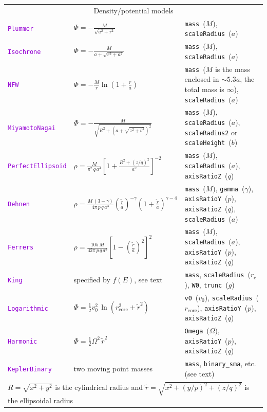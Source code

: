 \documentclass[12pt]{article}
\newcommand{\ttt}[1]{\textcolor{darkviolet}{\texttt{#1}}}
\newcommand{\ppp}[1]{\textcolor{darkolive} {\texttt{#1}}}
\begin{document}
\begin{table}
\begin{tabular}{l m{5cm} >{\raggedright\arraybackslash}m{7cm}}
\multicolumn{3}{c}{Density/potential models} \\

\ttt{Plummer} & $\Phi = -\frac{M}{\sqrt{a^2+r^2}}$ & \ppp{mass}~($M$), \ppp{scaleRadius}~($a$) \\[2mm]

\ttt{Isochrone} & $\Phi = - \frac{M}{a + \sqrt{r^2 + a^2}}$ & \ppp{mass}~($M$), \ppp{scaleRadius}~($a$) \\[2mm]

\ttt{NFW} & $\Phi = -\frac{M}{r} \ln\left(1 + \frac{r}{a}\right)$ & \ppp{mass}~($M$ {\footnotesize is the mass enclosed in $\sim5.3a$, the total mass is $\infty$}), \ppp{scaleRadius}~($a$) \\[2mm]

\ttt{MiyamotoNagai} & $\Phi = -\frac{M}{\sqrt{R^2 + \left(a + \sqrt{z^2+b^2}\right)^2}}$ & \ppp{mass}~($M$), \ppp{scaleRadius}~($a$), \ppp{scaleRadius2} or \ppp{scaleHeight}~($b$) \\[2mm]

\ttt{PerfectEllipsoid}\!\! & $\rho = \frac{M}{\pi^2\,q\,a^3} \left[ 1 + \frac{R^2+(z/q)^2}{a^2} \right]^{-2}$ &  \ppp{mass}~($M$), \ppp{scaleRadius}~($a$), \ppp{axisRatioZ}~($q$) \\[2mm]

\ttt{Dehnen} & $\rho = \frac{M\,(3-\gamma)}{4\pi\,p\,q\,a^3} \left(\frac{\tilde r}a\right)^{-\gamma} \left(1+\frac{\tilde r}a\right)^{\gamma-4}$\!\! &  \ppp{mass}~($M$), \ppp{gamma}~($\gamma$), \ppp{axisRatioY}~($p$), \ppp{axisRatioZ}~($q$), \ppp{scaleRadius}~($a$) \\[2mm]

\ttt{Ferrers} & $\rho = \frac{105\,M}{32\pi\,p\,q\,a^3} \left[1 - \left(\frac{\tilde r}a\right)^2\right]^2$ & \ppp{mass}~($M$), \ppp{scaleRadius}~($a$), \ppp{axisRatioY}~($p$), \ppp{axisRatioZ}~($q$) \\[2mm]

\ttt{King} & specified by $f(E)$, see text & 
\ppp{mass}, \ppp{scaleRadius}~($r_\mathrm{c}$), \ppp{W0}, \ppp{trunc}~($g$)
\\[1mm]

\ttt{Logarithmic} & $\Phi = \frac{1}{2} v_0^2\,\ln(r_\mathrm{core}^2 + \tilde r^2)$ & \ppp{v0}~($v_0$), \ppp{scaleRadius}~($r_\mathrm{core}$), \ppp{axisRatioY}~($p$), \ppp{axisRatioZ}~($q$) \\[2mm]

\ttt{Harmonic} & $\Phi = \frac{1}{2} \Omega^2\,\tilde r^2$ & \ppp{Omega}~($\Omega$), \ppp{axisRatioY}~($p$), \ppp{axisRatioZ}~($q$) \\[2mm]

\ttt{KeplerBinary} & two moving point masses & \ppp{mass}, \ppp{binary_sma}, etc. (see text) \\[2mm]

\multicolumn{3}{l}{\footnotesize $R=\sqrt{x^2+y^2}$ is the cylindrical radius and $\tilde r=\sqrt{x^2+(y/p)^2+(z/q)^2}$ is the ellipsoidal radius}
\end{tabular}
\end{table}
\end{document}
